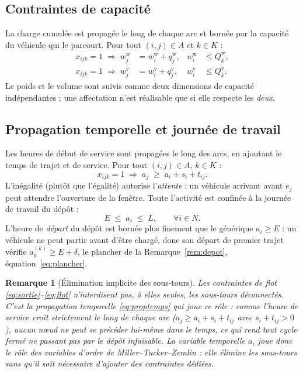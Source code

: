 \documentclass[12pt,a4paper]{report}
\newtheorem{remarque}{Remarque}
\begin{document}
\subsection{Contraintes de capacité}

La charge cumulée est propagée le long de chaque arc et bornée par la
capacité du véhicule qui le parcourt. Pour tout $(i,j) \in A$ et $k \in K$ :
%
\begin{align}
  x_{ijk} = 1 \;\Longrightarrow\;
    w_j^{\mathrm w} &= w_i^{\mathrm w} + q_j^{\mathrm w},
    & w_i^{\mathrm w} &\leq Q_k^{\mathrm w}, \label{eq:capp}\\
  x_{ijk} = 1 \;\Longrightarrow\;
    w_j^{\mathrm v} &= w_i^{\mathrm v} + q_j^{\mathrm v},
    & w_i^{\mathrm v} &\leq Q_k^{\mathrm v}. \label{eq:capv}
\end{align}
%
Le poids et le volume sont suivis comme deux dimensions de capacité
indépendantes ; une affectation n'est réalisable que si elle respecte les
\emph{deux}.

\subsection{Propagation temporelle et journée de travail}

Les heures de début de service sont propagées le long des arcs, en ajoutant
le temps de trajet et de service. Pour tout $(i,j) \in A$, $k \in K$ :
%
\begin{equation}
  x_{ijk} = 1 \;\Longrightarrow\;
  a_j \;\geq\; a_i + s_i + t_{ij}.
  \label{eq:proptemps}
\end{equation}
%
L'inégalité (plutôt que l'égalité) autorise l'\emph{attente} : un véhicule
arrivant avant $e_j$ peut attendre l'ouverture de la fenêtre. Toute
l'activité est confinée à la journée de travail du dépôt :
%
\begin{equation}
  E \;\leq\; a_i \;\leq\; L, \qquad \forall i \in N.
  \label{eq:journee}
\end{equation}
%
L'heure de \emph{départ} du dépôt est bornée plus finement que le générique
$a_i \geq E$ : un véhicule ne peut partir avant d'être chargé, donc son
départ de premier trajet vérifie $a_0^{(k)} \geq E + \delta$, le plancher de
la Remarque~\ref{rem:depot}, équation~\eqref{eq:plancher}.

\begin{remarque}[Élimination implicite des sous-tours]
Les contraintes de flot \eqref{eq:sortie}--\eqref{eq:flot} n'interdisent pas,
à elles seules, les sous-tours déconnectés. C'est la propagation temporelle
\eqref{eq:proptemps} qui joue ce rôle : comme l'heure de service croît
strictement le long de chaque arc ($a_j \geq a_i + s_i + t_{ij}$ avec
$s_i + t_{ij} > 0$), aucun nœud ne peut se précéder lui-même dans le temps,
ce qui rend tout cycle fermé ne passant pas par le dépôt infaisable. La
variable temporelle $a_i$ joue donc le rôle des variables d'ordre de
Miller--Tucker--Zemlin \cite{miller1960} : elle élimine les sous-tours sans
qu'il soit nécessaire d'ajouter des contraintes dédiées.
\end{remarque}
\end{document}
